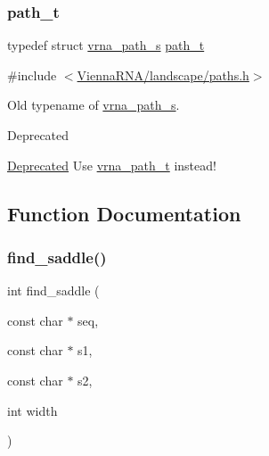 \subsubsection{\texorpdfstring{path\_t}{path\_t}}
{\footnotesize\ttfamily typedef struct \mbox{\hyperlink{group__paths_structvrna__path__s}{vrna\+\_\+path\+\_\+s}} \mbox{\hyperlink{group__paths__deprecated_gab6b8737d5377e70a7815d04aae7fd884}{path\+\_\+t}}}



{\ttfamily \#include $<$\mbox{\hyperlink{paths_8h}{Vienna\+R\+N\+A/landscape/paths.\+h}}$>$}



Old typename of \mbox{\hyperlink{group__paths_structvrna__path__s}{vrna\+\_\+path\+\_\+s}}. 

\begin{DoxyRefDesc}{Deprecated}
\item[\mbox{\hyperlink{deprecated__deprecated000168}{Deprecated}}]Use \mbox{\hyperlink{group__paths_ga818d4f3d1cf8723d6905990b08d909fe}{vrna\+\_\+path\+\_\+t}} instead!\end{DoxyRefDesc}


\subsection{Function Documentation}
\mbox{\label{group__paths__deprecated_ga4c0dabf032c04eeab9c7370d15db6ad2}} 
\subsubsection{\texorpdfstring{find\_saddle()}{find\_saddle()}}
{\footnotesize\ttfamily int find\+\_\+saddle (\begin{DoxyParamCaption}\item[{const char $\ast$}]{seq,  }\item[{const char $\ast$}]{s1,  }\item[{const char $\ast$}]{s2,  }\item[{int}]{width }\end{DoxyParamCaption})}



